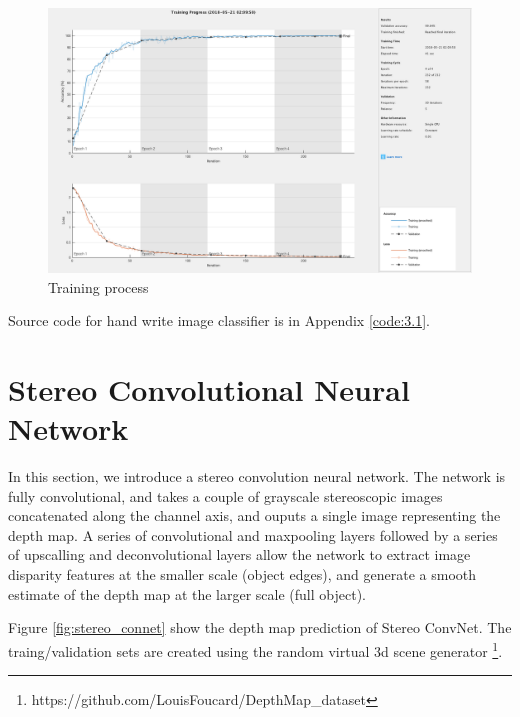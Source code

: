 \begin{figure}[h!]
	\centering
	\includegraphics[width=0.9\linewidth]{figures/part3/train}
	\caption{Training process}
	\label{fig:train}
\end{figure} 

Source code for hand write image classifier is in Appendix \ref{code:3.1}.

\section{Stereo Convolutional Neural Network}

In this section, we introduce a stereo convolution neural network. The network is fully convolutional, and takes a couple of grayscale stereoscopic images concatenated along the channel axis, and ouputs a single image representing the depth map. A series of convolutional and maxpooling layers followed by a series of upscalling and deconvolutional layers allow the network to extract image disparity features at the smaller scale (object edges), and generate a smooth estimate of the depth map at the larger scale (full object). 

Figure \ref{fig:stereo_connet} show the depth map prediction of Stereo ConvNet. The traing/validation sets are created using the random virtual 3d scene generator \footnote{https://github.com/LouisFoucard/DepthMap\_dataset}.

